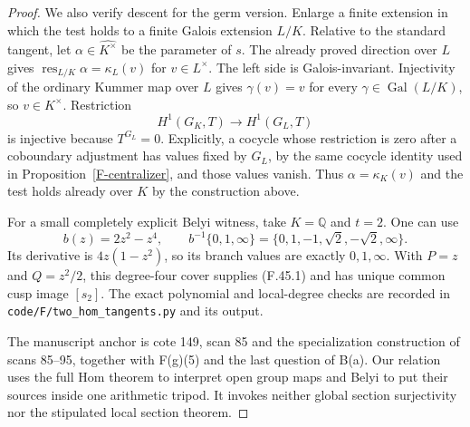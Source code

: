 \begin{proof}
We also verify descent for the germ version. Enlarge a finite
extension in which the test holds to a finite Galois extension
$L/K$. Relative to the standard tangent, let
$\alpha\in\widehat{K^\times}$ be the parameter of $s$.
The already proved direction over $L$ gives
$\operatorname{res}_{L/K}\alpha=\kappa_L(v)$ for $v\in L^\times$.
The left side is Galois-invariant. Injectivity of the ordinary
Kummer map over $L$ gives $\gamma(v)=v$ for every
$\gamma\in\operatorname{Gal}(L/K)$, so $v\in K^\times$.
Restriction
\[
 H^1(G_K,T)\longrightarrow H^1(G_L,T)
\]
is injective because $T^{G_L}=0$. Explicitly, a cocycle whose
restriction is zero after a coboundary adjustment has values
fixed by $G_L$, by the same cocycle identity used in
Proposition~\ref{F-centralizer}, and those values vanish.
Thus $\alpha=\kappa_K(v)$ and the test holds already over $K$
by the construction above.

For a small completely explicit Belyi witness, take $K=\mathbb Q$
and $t=2$. One can use
\[
 b(z)=2z^2-z^4,
 \qquad
 b^{-1}\{0,1,\infty\}
       =\{0,1,-1,\sqrt2,-\sqrt2,\infty\}.
\]
Its derivative is $4z(1-z^2)$, so its branch values are exactly
$0,1,\infty$. With $P=z$ and $Q=z^2/2$, this degree-four
cover supplies (F.45.1) and has unique common cusp image $[s_2]$.
The exact polynomial and local-degree checks are recorded in
\texttt{code/F/two\_hom\_tangents.py} and its output.

The manuscript anchor is cote 149, scan 85 and the specialization
construction of scans 85--95, together with F(g)(5) and the last
question of B(a). Our relation uses the full Hom theorem to
interpret open group maps and Belyi to put their sources inside
one arithmetic tripod. It invokes neither global section
surjectivity nor the stipulated local section theorem.
\end{proof}

